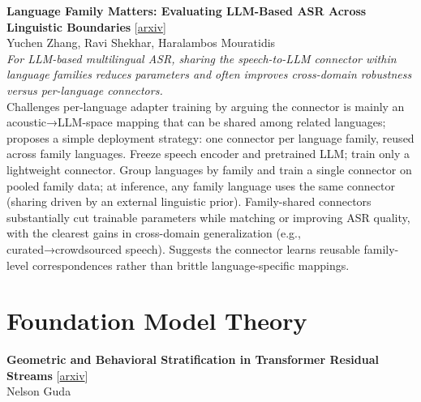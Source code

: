 \documentclass[12pt,letterpaper]{article}
\begin{document}
\medskip

{\small\textbf{Language Family Matters: Evaluating LLM-Based ASR Across Linguistic Boundaries}} {\scriptsize[\href{https://arxiv.org/abs/2601.18899}{arxiv}]}\\
{\scriptsize Yuchen Zhang, Ravi Shekhar, Haralambos Mouratidis}\\

{\small\textit{For LLM-based multilingual ASR, sharing the speech-to-LLM connector within language families reduces parameters and often improves cross-domain robustness versus per-language connectors.}}\\[1pt]
{\footnotesize Challenges per-language adapter training by arguing the connector is mainly an acoustic→LLM-space mapping that can be shared among related languages; proposes a simple deployment strategy: one connector per language family, reused across family languages. Freeze speech encoder and pretrained LLM; train only a lightweight connector. Group languages by family and train a single connector on pooled family data; at inference, any family language uses the same connector (sharing driven by an external linguistic prior). Family-shared connectors substantially cut trainable parameters while matching or improving ASR quality, with the clearest gains in cross-domain generalization (e.g., curated→crowdsourced speech). Suggests the connector learns reusable family-level correspondences rather than brittle language-specific mappings.}

\medskip


\section*{Foundation Model Theory}

{\small\textbf{Geometric and Behavioral Stratification in Transformer Residual Streams}} {\scriptsize[\href{https://arxiv.org/abs/2608.12447}{arxiv}]}\\
{\scriptsize Nelson Guda}\\
\end{document}
